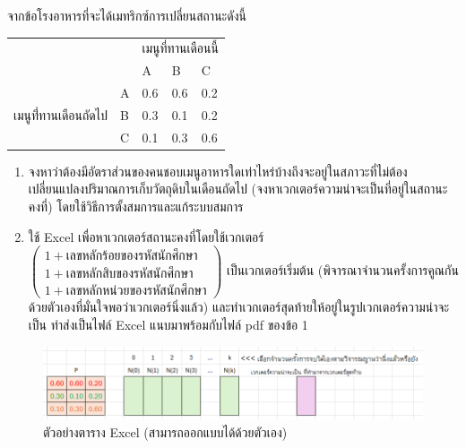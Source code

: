     จากข้อโรงอาหารที่จะได้เมทริกซ์การเปลี่ยนสถานะดังนี้
    \begin{center}
    \begin{tabular}{ll|lll|}
        \cline{3-5}
                                                                     &   & \multicolumn{3}{l|}{เมนูที่ทานเดือนนี้}                   \\ \cline{3-5} 
                                                                     &   & \multicolumn{1}{l|}{A}   & \multicolumn{1}{l|}{B}   & C   \\ \hline
        \multicolumn{1}{|l|}{\multirow{3}{*}{เมนูที่่ทานเดือนถัดไป}} & A & \multicolumn{1}{l|}{0.6} & \multicolumn{1}{l|}{0.6} & 0.2 \\ \cline{2-5} 
        \multicolumn{1}{|l|}{}                                       & B & \multicolumn{1}{l|}{0.3} & \multicolumn{1}{l|}{0.1} & 0.2 \\ \cline{2-5} 
        \multicolumn{1}{|l|}{}                                       & C & \multicolumn{1}{l|}{0.1} & \multicolumn{1}{l|}{0.3} & 0.6 \\ \hline
    \end{tabular}  
    \end{center}
    \begin{enumerate}
        \item จงหาว่าต้องมีอัตราส่วนของคนชอบเมนูอาหารใดเท่าไหร่บ้างถึงจะอยู่ในสภาวะที่ไม่ต้องเปลี่ยนแปลงปริมาณการเก็บวัตถุดิบในเดือนถัดไป (จงหาเวกเตอร์ความน่าจะเป็นที่อยู่ในสถานะคงที่) โดยใช้วิธีการตั้งสมการและแก้ระบบสมการ
        \item ใช้ Excel เพื่อหาเวกเตอร์สถานะคงที่โดยใช้เวกเตอร์ $\begin{pmatrix}
            1 + \text{เลขหลักร้อยของรหัสนักศึกษา}\\
            1 + \text{เลขหลักสิบของรหัสนักศึกษา}\\
            1 + \text{เลขหลักหน่วยของรหัสนักศึกษา}
        \end{pmatrix}$ เป็นเวกเตอร์เริ่มต้น (พิจารณาจำนวนครั้งการคูณกันด้วยตัวเองที่มั่นใจพอว่าเวกเตอร์นิ่งแล้ว) และทำเวกเตอร์สุดท้ายให้อยู่ในรูปเวกเตอร์ความน่าจะเป็น ทำส่งเป็นไฟล์ Excel แนบมาพร้อมกับไฟล์ pdf ของข้อ 1
    \end{enumerate}
    \begin{figure}[h]
        \centering
        \includegraphics[width=1\linewidth]{Homework4-template.png}
        \caption{ตัวอย่างตาราง Excel (สามารถออกแบบได้ด้วยตัวเอง)}
    \end{figure}
    
